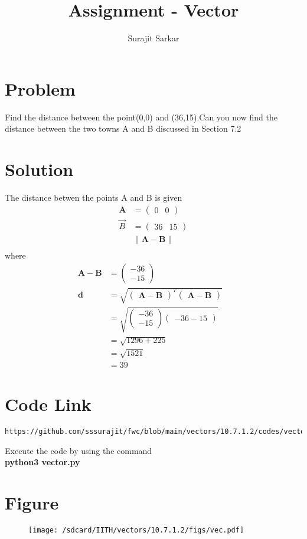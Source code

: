 \documentclass[journal,12pt,twocolumn]{IEEEtran}
\title{\mytitle}
\title{
Assignment - Vector
}
\author{Surajit Sarkar}
\newcommand{\myvec}[1]{\ensuremath{\begin{pmatrix}#1\end{pmatrix}}}
\providecommand{\norm}[1]{\lVert#1\rVert}
\let\vec\mathbf
\begin{document}
\maketitle
\tableofcontents
\bigskip
\section{\textbf{Problem}}
Find the distance between the point(0,0) and (36,15).Can you now find the distance between the two towns A and B discussed in Section 7.2
\section{\textbf{Solution}}
The distance betwen the points A and B is given
\begin{align}
\vec{A}&=\myvec{0 & 0}\\ 
\Vec{B}&=\myvec{36 & 15} \\
&\norm{\vec{A}-\vec{B}}\\
\end{align}
where
\begin{align}
\vec{A}-\vec{B}&=\myvec{-36\\-15} \\
\vec{d}&=\sqrt{\myvec{\vec{A}-\vec{B}}^T\myvec{\vec{A}-\vec{B}}}\\
&=\sqrt{\myvec{-36\\-15}{\myvec{-36-15}}}\\
&=\sqrt{1296+225} &\\
&=\sqrt{1521} &\\
&=39
\end{align}
\section{\textbf{Code Link}}
\begin{lstlisting}
https://github.com/sssurajit/fwc/blob/main/vectors/10.7.1.2/codes/vector.py
\end{lstlisting}
Execute the code by using the command\\
\textbf{python3 vector.py}\\
\section{\textbf{Figure}}
\begin{figure}[!ht]
    \centering
\texttt{[image: /sdcard/IITH/vectors/10.7.1.2/figs/vec.pdf]}
\caption{}
\label{fig:vec}
\end{figure}
\end{document}
